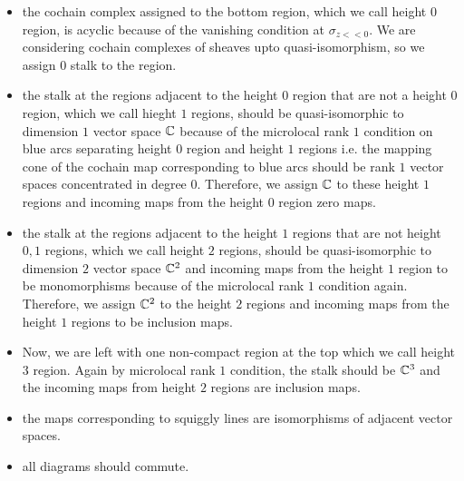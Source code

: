 \begin{itemize}
\item the cochain complex assigned to the bottom region, which we call height $0$ region, is acyclic because of the vanishing condition at $\sigma_{z<<0}$. We are considering cochain complexes of sheaves upto quasi-isomorphism, so we assign $0$ stalk to the region.

\item the stalk at the regions adjacent to the height $0$ region that are not a height $0$ region, which we call hieght $1$ regions, should be quasi-isomorphic to dimension $1$ vector space $\mathbb{C}$ because of the microlocal rank $1$ condition on blue arcs separating height $0$ region and height $1$ regions i.e. the mapping cone of the cochain map corresponding to blue arcs should be rank $1$ vector spaces concentrated in degree $0$. Therefore, we assign $\mathbb{C}$ to these height $1$ regions and incoming maps from the height $0$ region zero maps.

\item the stalk at the regions adjacent to the height $1$ regions that are not height $0,1$ regions, which we call height $2$ regions, should be quasi-isomorphic to dimension $2$ vector space $\mathbb{C}^2$ and incoming maps from the height $1$ region to be monomorphisms because of the microlocal rank $1$ condition again. Therefore, we assign $\mathbb{C}^2$ to the height $2$ regions and incoming maps from the height $1$ regions to be inclusion maps.

\item Now, we are left with one non-compact region at the top which we call height $3$ region. Again by microlocal rank $1$ condition, the stalk should be $\mathbb{C}^3$ and the incoming maps from height $2$ regions are inclusion maps.

\item the maps corresponding to squiggly lines are isomorphisms of adjacent vector spaces.

\item all diagrams should commute.


\end{itemize}
